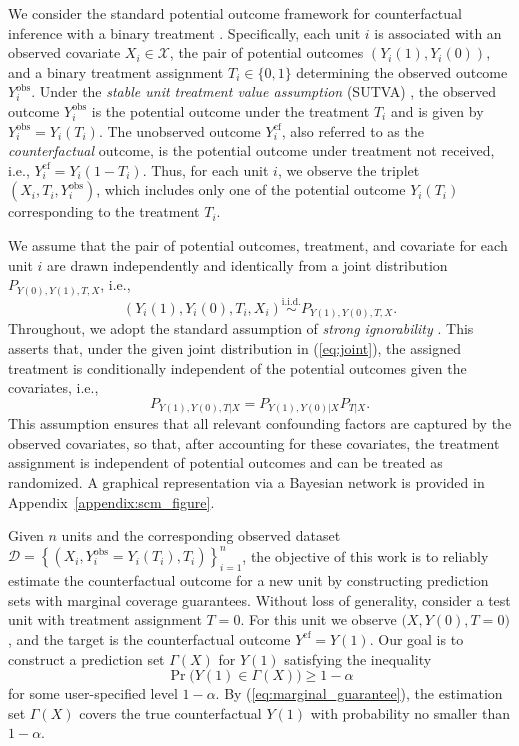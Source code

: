 \documentclass{article}
\theoremstyle{plain}
\theoremstyle{definition}
\theoremstyle{remark}
\begin{document}
We consider the standard potential outcome framework for counterfactual inference with a binary treatment \citep{splawa1990application, rubin1974estimating}. Specifically, each unit $i$ is associated with an observed covariate $X_i \in \mathcal{X}$, the pair of potential outcomes $(Y_i(1), Y_i(0))$, and a binary treatment assignment $T_i \in \{0,1\}$ determining the observed outcome $Y_i^{\text{obs}}$. Under the \textit{stable unit treatment value assumption} (SUTVA) \citep{rubin1990formal}, the observed outcome $Y_i^{\text{obs}}$ is the potential outcome under the treatment $T_i$ and is given by $Y_i^{\text{obs}} = Y_i(T_i)$. The unobserved outcome $Y_i^{\text{cf}}$, also referred to as the \textit{counterfactual} outcome, is the potential outcome under treatment not received, i.e., $Y_i^{\text{cf}} = Y_i(1-T_i)$. Thus, for each unit $i$, we observe the triplet \( (X_i, T_i, Y_i^{\text{obs}}) \), which includes only one of the potential outcome $Y_i(T_i)$ corresponding to the treatment $T_i$.



We assume that the pair of potential outcomes, treatment, and covariate for each unit $i$ are drawn independently and identically from a joint distribution $P_{Y(0), Y(1), T, X}$, i.e.,
\begin{equation}
\label{eq:joint}
(Y_i(1), Y_i(0), T_i, X_i) \stackrel{\text{i.i.d.}}{\sim} P_{Y(1), Y(0), T, X}.
\end{equation}
Throughout, we adopt the standard assumption of \textit{strong ignorability} \citep{rosenbaum1983central, rubin1978bayesian, imbens2015causal}. This asserts that, under the given joint distribution in (\ref{eq:joint}), the assigned treatment is conditionally independent of the potential outcomes given the covariates, i.e.,
\begin{equation}
\label{eq:ignorability}
P_{Y(1), Y(0), T|X}=P_{Y(1), Y(0)|X}P_{T|X}.
\end{equation}
This assumption ensures that all relevant confounding factors are captured by the observed covariates, so that, after accounting for these covariates, the treatment assignment is independent of potential outcomes and can be treated as randomized. A graphical representation via a Bayesian network is provided in Appendix~\ref{appendix:scm_figure}.

Given $n$ units and the corresponding observed dataset $\mathcal{D} = \left\{ (X_i, Y^\text{obs}_i = Y_i(T_i), T_i)\right\}_{i = 1}^n$, the objective of this work is to reliably estimate the counterfactual outcome for a new unit by constructing prediction sets with marginal coverage guarantees.   Without loss of generality, consider a test unit with treatment assignment $T = 0$. For this unit we observe $\big(X, Y(0), T=0\big)$, and the target is the counterfactual outcome $Y^{\text{cf}} = Y(1)$. Our goal is to construct a prediction set $\Gamma(X)$ for $Y(1)$ satisfying the inequality
\begin{equation}
\label{eq:marginal_guarantee}
    \Pr\big(Y(1)\in \Gamma(X)\big) \geq 1- \alpha
\end{equation}
for some user-specified level $1-\alpha$. By (\ref{eq:marginal_guarantee}), the estimation set $\Gamma(X)$ covers the true counterfactual $Y(1)$ with probability no smaller than $1-\alpha$.
\end{document}
